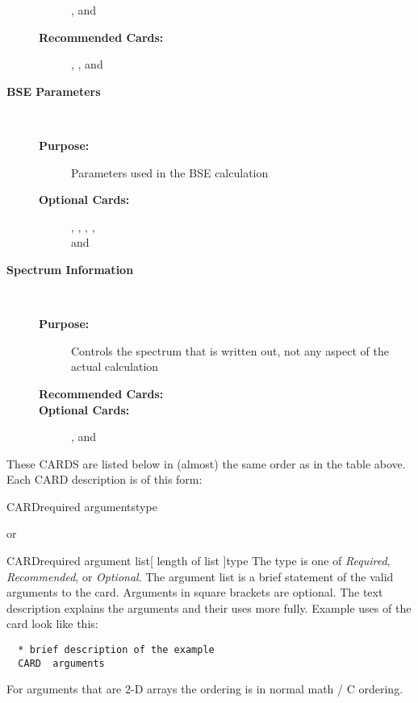 \documentclass[11pt]{report}
\begin{document}
\begin{description}
\begin{description}
    ,
    and 
  \item[\textbf{Recommended Cards:}] 
      ,
      ,
      and 
  \end{description}
\item[\large\textbf{BSE Parameters}]\dotfill\
  \begin{description}
  \item[\textbf{Purpose:}] Parameters used in the BSE calculation
  \item[\textbf{Optional Cards:}]   
    ,
    ,
    ,
    , \\
    and 
  \end{description}
\item[\large\textbf{Spectrum Information}]\dotfill\
  \begin{description}
  \item[\textbf{Purpose:}] Controls the spectrum that is written out, not any aspect of the actual calculation
  \item[\textbf{Recommended Cards:}]   
    \htmlref{CNBSE.BROADEN}{card:broaden}  
   \item[\textbf{Optional Cards:}]   
    ,
    and 
  \end{description}   
\end{description}

These CARDS are listed below in (almost) the same order as in the table above.
Each CARD description is of this form:

\begin{Card}{CARD}{required arguments}{type}{}
\end{Card}
or \\
\begin{Card}{CARD}{required argument list[ length of list ]}{type}{}
  The type is one of \textsl{Required}, \textsl{Recommended}, or
  \textsl{Optional}. The argument list is a brief statement of the
  valid arguments to the card. Arguments in square brackets are 
  optional. The text description explains the arguments and 
  their uses more fully. Example uses of the card look like this:
\begin{verbatim}
  * brief description of the example
  CARD  arguments
\end{verbatim}

For arguments that are 2-D arrays the ordering is in normal math / C ordering.
\end{Card}
\end{document}
